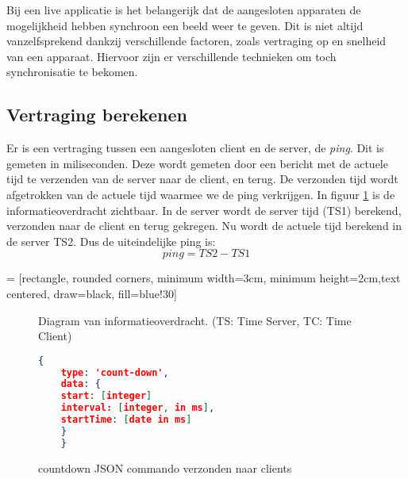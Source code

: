Bij een live applicatie is het belangerijk dat de aangesloten apparaten de mogelijkheid hebben synchroon een beeld weer te geven. Dit is niet altijd vanzelfsprekend dankzij verschillende factoren, zoals vertraging op en snelheid van een apparaat. Hiervoor zijn er verschillende technieken om toch synchronisatie te bekomen.

\subsection{Vertraging berekenen}
Er is een vertraging tussen een aangesloten client en de server, de {\it ping}. Dit is gemeten in miliseconden.
Deze wordt gemeten door een bericht met de actuele tijd te verzenden van de server naar de client, en terug. De verzonden tijd wordt afgetrokken van de actuele tijd waarmee we de ping verkrijgen.
In figuur \ref{diag} is de informatieoverdracht zichtbaar. In de server wordt de server tijd (TS1) berekend, verzonden naar de client en terug gekregen.
Nu wordt de actuele tijd berekend in de server TS2. Dus de uiteindelijke ping is:
\[ping = TS2 - TS1\]

 = [rectangle, rounded corners, minimum width=3cm, minimum height=2cm,text centered, draw=black, fill=blue!30]


\begin{figure}
    \caption{Diagram van informatieoverdracht. (TS: Time Server, TC: Time Client)} \label{diag}
\end{figure}

\begin{figure}
    \begin{lstlisting}[language=json,firstnumber=1]
    {
    type: 'count-down',
    data: {
    start: [integer]
    interval: [integer, in ms],
    startTime: [date in ms]
    }
    }
    \end{lstlisting}
    \caption{countdown JSON commando verzonden naar clients} \label{json2}
\end{figure}


